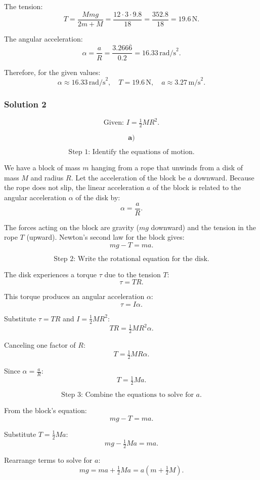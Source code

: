 \documentclass{article}
\begin{document}
The tension:
\[
T = \frac{M m g}{2 m + M} = \frac{12 \cdot 3 \cdot 9.8}{18} = \frac{352.8}{18} = 19.6\,\text{N}.
\]

The angular acceleration:
\[
\alpha = \frac{a}{R} = \frac{3.266\overline{6}}{0.2} = 16.33\,\text{rad/s}^2.
\]

Therefore, for the given values:
\[
\alpha \approx 16.33\,\text{rad/s}^2, \quad T = 19.6\,\text{N}, \quad a \approx 3.27\,\text{m/s}^2.
\]

\subsubsection{Solution 2}

\[
\text{Given: } I = \tfrac{1}{2}MR^2.
\]

\[
\textbf{a)} 
\]

\[
\text{Step 1: Identify the equations of motion.}
\]

We have a block of mass \(m\) hanging from a rope that unwinds from a disk of mass \(M\) and radius \(R\). Let the acceleration of the block be \(a\) downward. Because the rope does not slip, the linear acceleration \(a\) of the block is related to the angular acceleration \(\alpha\) of the disk by:
\[
\alpha = \frac{a}{R}.
\]

The forces acting on the block are gravity (\(mg\) downward) and the tension in the rope \(T\) (upward). Newton’s second law for the block gives:
\[
mg - T = ma.
\]

\[
\text{Step 2: Write the rotational equation for the disk.}
\]

The disk experiences a torque \(\tau\) due to the tension \(T\):
\[
\tau = T R.
\]

This torque produces an angular acceleration \(\alpha\):
\[
\tau = I \alpha.
\]

Substitute \(\tau = TR\) and \(I = \tfrac{1}{2}MR^2\):
\[
T R = \tfrac{1}{2} M R^2 \alpha.
\]

Canceling one factor of \(R\):
\[
T = \tfrac{1}{2} M R \alpha.
\]

Since \(\alpha = \tfrac{a}{R}\):
\[
T = \tfrac{1}{2} M a.
\]

\[
\text{Step 3: Combine the equations to solve for } a.
\]

From the block’s equation:
\[
mg - T = ma.
\]

Substitute \(T = \tfrac{1}{2} M a\):
\[
mg - \tfrac{1}{2} M a = ma.
\]

Rearrange terms to solve for \(a\):
\[
mg = ma + \tfrac{1}{2} M a = a \left(m + \tfrac{1}{2} M \right).
\]
\end{document}
